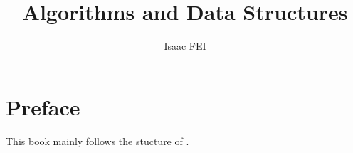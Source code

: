 \documentclass[thmcnt=section, color=cyan, 12pt]{my-elegantbook}
\title{Algorithms and Data Structures}
\author{Isaac FEI}
\begin{document}
\maketitle


\frontmatter
\chapter*{Preface}

This book mainly follows the stucture of \cite{cormenIntroductionAlgorithms2009}.



\tableofcontents
\mainmatter








\printbibliography[heading=bibintoc, title=References]


\printindex
\end{document}
